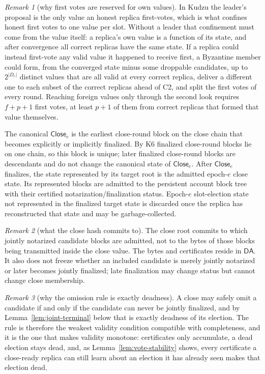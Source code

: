 \documentclass[11pt]{article}
\theoremstyle{remark}
\newtheorem{remark}{Remark}
\newcommand{\CE}{\mathsf{Close}}
\newcommand{\DA}{\mathsf{DA}}
\begin{document}
\begin{remark}[why first votes are reserved for own values]
In Kudzu the leader's proposal is the only value an honest replica first-votes, which is what confines honest first votes to one value per slot. Without a leader that confinement must come from the value itself: a replica's own value is a function of its state, and after convergence all correct replicas have the same state. If a replica could instead first-vote any valid value it happened to receive first, a Byzantine member could form, from the converged state minus some droppable candidates, up to $2^{|D_e|}$ distinct values that are all valid at every correct replica, deliver a different one to each subset of the correct replicas ahead of C2, and split the first votes of every round. Reaching foreign values only through the second look requires $f+p+1$ first votes, at least $p+1$ of them from correct replicas that formed that value themselves.
\end{remark}

The canonical $\CE_e$ is the earliest close-round block on the close chain that becomes explicitly or implicitly finalized. By K6 finalized close-round blocks lie on one chain, so this block is unique; later finalized close-round blocks are descendants and do not change the canonical state of $\CE_e$. After $\CE_e$ finalizes, the state represented by its target root is the admitted epoch-$e$ close state. Its represented blocks are admitted to the persistent account block tree with their certified notarization/finalization status. Epoch-$e$ slot-election state not represented in the finalized target state is discarded once the replica has reconstructed that state and may be garbage-collected.

\begin{remark}[what the close hash commits to]
The close root commits to which jointly notarized candidate blocks are admitted, not to the bytes of those blocks being transmitted inside the close value. The bytes and certificates reside in $\DA$. It also does not freeze whether an included candidate is merely jointly notarized or later becomes jointly finalized; late finalization may change status but cannot change close membership.
\end{remark}

\begin{remark}[why the omission rule is exactly deadness]
A close may safely omit a candidate if and only if the candidate can never be jointly finalized, and by Lemma~\ref{lem:joint-terminal} below that is exactly deadness of its election. The rule is therefore the weakest validity condition compatible with completeness, and it is the one that makes validity monotone: certificates only accumulate, a dead election stays dead, and, as Lemma~\ref{lem:vote-stability} shows, every certificate a close-ready replica can still learn about an election it has already seen makes that election dead.
\end{remark}
\end{document}

